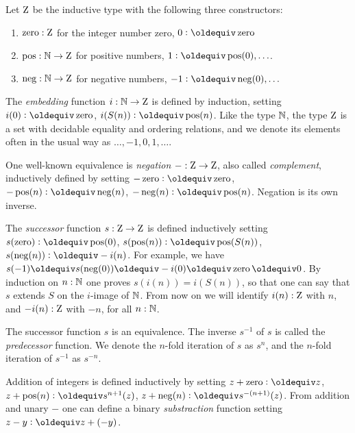 \documentclass[a4paper,12pt]{amsart}
\begin{document}
\begin{definition}\label{def:integers}
Let $\mathrm{Z}$ be the inductive type with the following three constructors:
\begin{enumerate}[topsep=0pt]
\item $\mathop{\mathrm{zero}}: \mathrm{Z}$ for the integer number zero, 
$0 \defeq \zzero$
\item $\mathop{\mathrm{pos}}: \mathbb{N} \to \mathrm{Z}$ for positive numbers,
$1 \defeq \zpos(0),\ldots$.
\item $\mathop{\mathrm{neg}}: \mathbb{N} \to \mathrm{Z}$ for negative numbers, 
$-1 \defeq \zneg(0),\ldots$
\end{enumerate}
\end{definition}

The \emph{embedding} function $i:\mathbb{N}\to\mathrm{Z}$ is defined by induction,
setting $i(0)\defeq \zzero$, $i(S(n))\defeq \zpos(n)$.
Like the type $\mathbb{N}$, the type $\mathrm{Z}$ is a set with decidable equality
and ordering relations,
and we denote its elements often in the usual way as $\ldots,-1,0,1,\ldots$.

One well-known equivalence is \emph{negation} ${-}:\mathrm{Z}\to\mathrm{Z}$, 
also called \emph{complement}, inductively defined by setting 
$-\zzero\defeq \zzero$, 
$-\zpos(n)\defeq \zneg(n)$, 
$-\zneg(n)\defeq \zpos(n)$.
Negation is its own inverse.

The \emph{successor} function $s:\mathrm{Z}\to\mathrm{Z}$ is defined inductively setting 
$s(\zzero)\defeq \zpos(0)$, 
$s(\zpos(n))\defeq \zpos(S(n))$,
$s(\zneg(n))\defeq -i(n)$. For example, we have
$s(-1)\jdeq s(\zneg(0))\jdeq -i(0) \jdeq \zzero \jdeq 0$.
By induction on $n:\mathbb{N}$ one proves $s(i(n))=i(S(n))$, 
so that one can say that $s$ extends $S$ on the $i$-image of $\mathbb{N}$. 
From now on we will identify $i(n):\mathrm{Z}$ with $n$,
and $-i(n):\mathrm{Z}$ with $-n$, for all $n:\mathbb{N}$.

The successor function $s$ is an equivalence.
The inverse $s^{-1}$ of $s$ is called the \emph{predecessor} function.
We denote the $n$-fold iteration of $s$ as $s^n$, and
the $n$-fold iteration of $s^{-1}$ as $s^{-n}$.

Addition of integers is defined inductively by setting
$z + \zzero\defeq z$, 
$z + \zpos(n)\defeq s^{n+1}(z)$, 
$z + \zneg(n)\defeq s^{-(n+1)}(z)$.
From addition and unary $-$ one can define a binary
\emph{substraction} function setting $z-y \defeq z+(-y)$.
\end{document}
